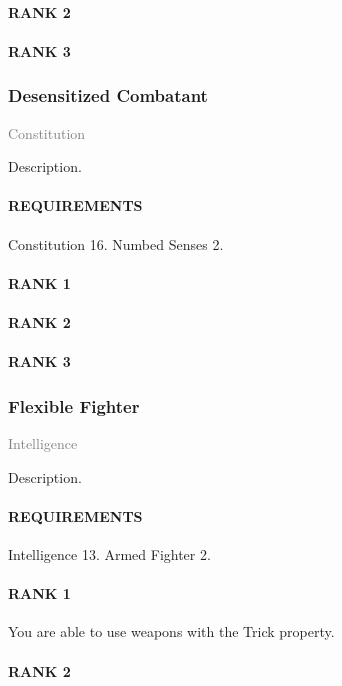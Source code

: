 \paragraph{RANK 2}
\paragraph{RANK 3}

\subsubsection{Desensitized Combatant} \label{feat::desensitizedcombatant}
\small{\textcolor{gray}{Constitution}}

\normalsize
Description.
\paragraph{REQUIREMENTS} Constitution 16. Numbed Senses 2.
\paragraph{RANK 1}
\paragraph{RANK 2}
\paragraph{RANK 3}

\subsubsection{Flexible Fighter} \label{feat::flexiblefighter} %
\small{\textcolor{gray}{Intelligence}}

\normalsize
Description.
\paragraph{REQUIREMENTS} Intelligence 13. Armed Fighter 2.
\paragraph{RANK 1} You are able to use weapons with the Trick property.
\paragraph{RANK 2}
